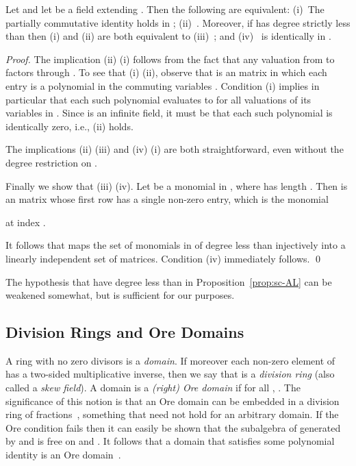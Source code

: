 \documentclass[runningheads]{llncs}
\begin{document}
\begin{proposition}
Let  and let  be a field
extending .  Then the following are equivalent: (i)~The partially
commutative identity  holds in ; (ii)~.  Moreover, if  has degree strictly
less than  then (i) and (ii) are both equivalent to
(iii)~; and (iv)~ is identically  in .
\label{prop:sc-AL}
\end{proposition}
\begin{proof}
  The implication (ii)  (i) follows from the fact that
  any valuation from  to  factors through .  To
  see that (i)  (ii), observe that  is an
   matrix in which each entry is a polynomial in the
  commuting variables .  Condition (i) implies in particular
  that each such polynomial evaluates to  for all valuations of its
  variables in .  Since  is an infinite field, it must be that
  each such polynomial is identically zero, i.e., (ii) holds.

  The implications (ii)  (iii) and (iv)  (i)
  are both straightforward, even without the degree restriction on .

Finally we show that (iii)  (iv).  Let  be a monomial in , where  has length
.  Then  is an  matrix whose first row has a single non-zero entry, which
is the monomial

at index .

It follows that  maps the set of monomials in  of degree less than  injectively into a 
linearly independent set of matrices.  Condition (iv)
immediately follows.  \qed
\end{proof}
The hypothesis that  have degree less than  in
Proposition~\ref{prop:sc-AL} can be weakened somewhat, but is
sufficient for our purposes.

\subsection{Division Rings and Ore Domains}
A ring  with no zero divisors is a \emph{domain}.  If moreover each
non-zero element of  has a two-sided multiplicative inverse, then we
say that  is a \emph{division ring} (also called a
\emph{skew field}).  A domain  is a \emph{(right) Ore domain}
if for all , .  The
significance of this notion is that an Ore domain can be embedded in a
division ring of fractions~\cite[Corollary 7.1.6]{Cohn03}, something
that need not hold for an arbitrary domain.  If the Ore condition
fails then it can easily be shown that the subalgebra of  generated
by  and  is free on  and .  It follows that a domain 
that satisfies some polynomial identity is an Ore
domain~\cite[Corollary 7.5.2]{Cohn03}.
\end{document}
